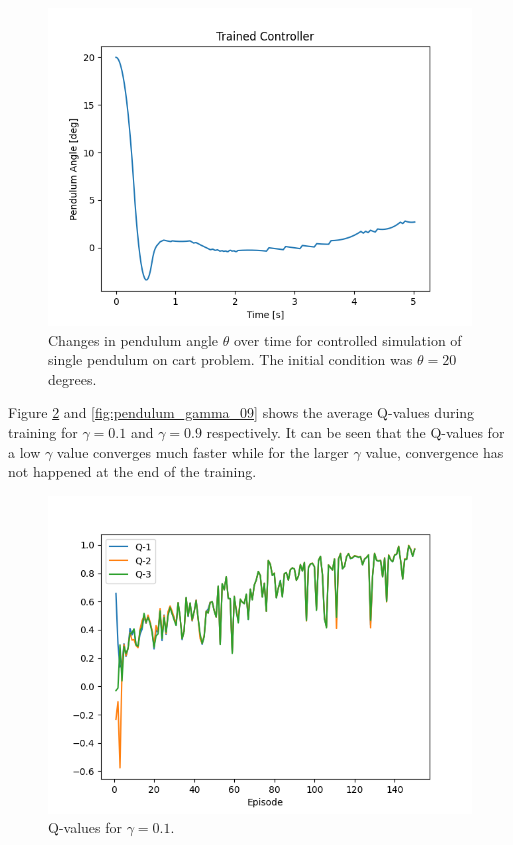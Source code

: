 \documentclass{LTHtwocol} %
\begin{document}
\begin{figure}[H]
	\centering
	\includegraphics[width=0.9\columnwidth]{figures/Pendulum_angle_20.png}
	\caption{Changes in pendulum angle $\theta$ over time for controlled simulation of single pendulum on cart problem. The initial condition was $\theta = 20$ degrees.}
	\label{fig:single_pendulum_outside_training_domain}
\end{figure}
Figure \ref{fig:pendulum_gamma_01} and \ref{fig:pendulum_gamma_09} shows the average Q-values during training for $\gamma=0.1$ and $\gamma=0.9$ respectively. It can be seen that the Q-values for a low $\gamma$ value converges much faster while for the larger $\gamma$ value, convergence has not happened at the end of the training.
\begin{figure}[H]
	\centering
	\includegraphics[width=0.9\columnwidth]{figures/Pendulum_q_gamma_01.png}
	\caption{Q-values for $\gamma=0.1$.}
	\label{fig:pendulum_gamma_01}
\end{figure} 
\end{document}
